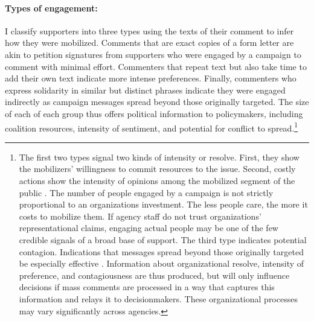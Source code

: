 



\paragraph{Types of engagement:} I classify supporters into three types using the texts of their comment to infer how they were mobilized.  Comments that are exact copies of a form letter are akin to petition signatures from supporters who were engaged by a campaign to comment with minimal effort. Commenters that repeat text but also take time to add their own text indicate more intense preferences. Finally, commenters who express solidarity in similar but distinct phrases indicate they were engaged indirectly
as campaign messages spread beyond those originally targeted. The size of each of each group thus offers political information to policymakers, including coalition resources, intensity of sentiment, and potential for conflict to spread.\footnote{
The first two types signal two kinds of intensity or resolve. First, they show the mobilizers' willingness to commit resources to the issue. Second, costly actions show the intensity of opinions among the mobilized segment of the public \citep{Dunleavy1991}. The number of people engaged by a campaign is not strictly proportional to an organizations investment. The less people care, the more it costs to mobilize them. If agency staff do not trust organizations' representational claims, engaging actual people may be one of the few credible signals of a broad base of support. The third type indicates potential contagion. Indications that messages spread beyond those originally targeted be especially effective \citep{Kollman1998}. Information about organizational resolve, intensity of preference, and contagiousness are thus produced, but will only influence decisions if mass comments are processed in a way that captures this information and relays it to decisionmakers. These organizational processes may vary significantly across agencies.
}


